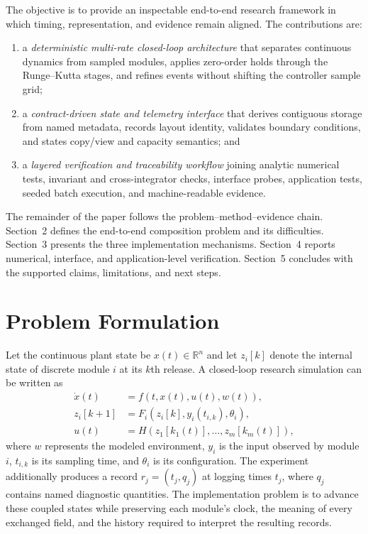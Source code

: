 \documentclass[11pt,a4paper]{article}
\begin{document}
The objective is to provide an inspectable end-to-end research framework in which timing, representation, and evidence remain aligned. The contributions are:
\begin{enumerate}
  \item a \emph{deterministic multi-rate closed-loop architecture} that separates continuous dynamics from sampled modules, applies zero-order holds through the Runge--Kutta stages, and refines events without shifting the controller sample grid;
  \item a \emph{contract-driven state and telemetry interface} that derives contiguous storage from named metadata, records layout identity, validates boundary conditions, and states copy/view and capacity semantics; and
  \item a \emph{layered verification and traceability workflow} joining analytic numerical tests, invariant and cross-integrator checks, interface probes, application tests, seeded batch execution, and machine-readable evidence.
\end{enumerate}
The remainder of the paper follows the problem--method--evidence chain. Section~2 defines the end-to-end composition problem and its difficulties. Section~3 presents the three implementation mechanisms. Section~4 reports numerical, interface, and application-level verification. Section~5 concludes with the supported claims, limitations, and next steps.

\section{Problem Formulation}
Let the continuous plant state be $x(t)\in\mathbb{R}^{n}$ and let $z_i[k]$ denote the internal state of discrete module $i$ at its $k$th release. A closed-loop research simulation can be written as
\begin{align}
\dot{x}(t) &= f\!\left(t,x(t),u(t),w(t)\right), \\
z_i[k+1] &= F_i\!\left(z_i[k],y_i(t_{i,k}),\theta_i\right), \\
u(t) &= H\!\left(z_1[k_1(t)],\ldots,z_m[k_m(t)]\right),
\end{align}
where $w$ represents the modeled environment, $y_i$ is the input observed by module $i$, $t_{i,k}$ is its sampling time, and $\theta_i$ is its configuration. The experiment additionally produces a record $r_j=(t_j,q_j)$ at logging times $t_j$, where $q_j$ contains named diagnostic quantities. The implementation problem is to advance these coupled states while preserving each module's clock, the meaning of every exchanged field, and the history required to interpret the resulting records.
\end{document}
